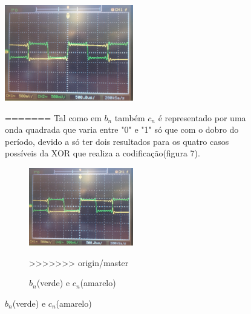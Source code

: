 \documentclass[11pt]{article}
\begin{document}
\begin{figure}[H]
	\centering
	\includegraphics[width=0.5\textwidth]{./bn_cn}~\\
	\caption{$ b_n $(verde) e $ c_n $(amarelo)}
	\label{bn_cn}
=======
Tal como em $ b_n $ também $ c_n $ é representado por uma onda quadrada que varia entre "0" e "1" só que com o dobro do período, devido a só ter dois resultados para os quatro casos possíveis da XOR que realiza a codificação(figura 7).

\begin{figure}[h]
	\centering
	\includegraphics[width=0.5\textwidth]{./bn_cn}~\\
	\caption{$ b_n $(verde) e $ c_n $(amarelo)}
>>>>>>> origin/master
\end{figure}


\end{figure}
\end{document}
